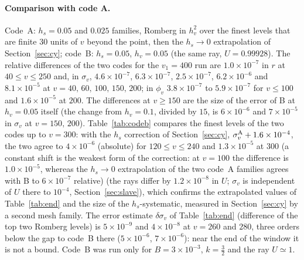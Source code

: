 \documentclass[11pt]{article}
\begin{document}
\paragraph{Comparison with code A.} Code~A: $h_s=0.05$ and $0.025$ families, Romberg in $h_v^{2}$ over the finest levels that are finite $30$ units of $v$ beyond the point, then the $h_s\to0$ extrapolation of Section~\ref{sec:cy}; code~B: $h_s=0.05$, $h_v=0.05$ (the same ray, $U=0.99928$). The relative differences of the two codes for the $v_1=400$ run are $1.0\times10^{-7}$ in $r$ at $40\le v\le250$ and, in $\sigma_v$, $4.6\times10^{-7}$, $6.3\times10^{-7}$, $2.5\times10^{-7}$, $6.2\times10^{-6}$ and $8.1\times10^{-5}$ at $v=40,\,60,\,100,\,150,\,200$; in $\phi_v$ $3.8\times10^{-7}$ to $5.9\times10^{-7}$ for $v\le100$ and $1.6\times10^{-5}$ at $200$. The differences at $v\ge150$ are the size of the error of B at $h_v=0.05$ itself (the change from $h_v=0.1$, divided by $15$, is $6\times10^{-6}$ and $7\times10^{-5}$ in $\sigma_v$ at $v=150,\,200$). Table~\ref{tab:codeb} compares the finest levels of the two codes up to $v=300$: with the $h_s$ correction of Section~\ref{sec:cy}, $\sigma_v^{\rm A}+1.6\times10^{-4}$, the two agree to $4\times10^{-6}$ (absolute) for $120\le v\le240$ and $1.3\times10^{-5}$ at $300$ (a constant shift is the weakest form of the correction: at $v=100$ the difference is $1.0\times10^{-5}$, whereas the $h_s\to0$ extrapolation of the two code~A families agrees with B to $6\times10^{-7}$ relative) (the rays differ by $1.2\times10^{-8}$ in $U$; $\sigma_v$ is independent of $U$ there to $10^{-4}$, Section~\ref{sec:slave}), which confirms the extrapolated values of Table~\ref{tab:end} and the size of the $h_s$-systematic, measured in Section~\ref{sec:cy} by a second mesh family. The error estimate $\delta\sigma_v$ of Table~\ref{tab:end} (difference of the top two Romberg levels) is $5\times10^{-9}$ and $4\times10^{-8}$ at $v=260$ and $280$, three orders below the gap to code~B there ($5\times10^{-6}$, $7\times10^{-6}$): near the end of the window it is not a bound. Code~B was run only for $B=3\times10^{-3}$, $k=\tfrac32$ and the ray $U\simeq1$.
\end{document}
